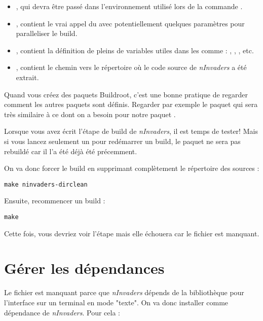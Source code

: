 \begin{itemize}

\item {}, qui devra être passé dans l'environnement utilisé
  lors de la commande .

\item {}, contient le vrai appel du  avec potentiellement
  quelques paramètres pour paralleliser le build.

\item {}, contient la définition de pleins de
  variables utiles dans les  comme : ,
  , , etc.

\item {}, contient le chemin vers le répertoire où le code source de
  {\em nInvaders} a été extrait.

\end{itemize}

Quand vous créez des paquets Buildroot, c'est une bonne pratique de regarder
comment les autres paquets sont définis. Regarder par exemple le paquet
 qui sera très similaire à ce dont on a besoin pour notre paquet
.

Lorsque vous avez écrit l'étape de build de {\em nInvaders}, il est temps
de tester! Mais si vous lancez seulement un  pour redémarrer
un build, le paquet  ne sera pas rebuildé car il l'a été
déjà été précemment.

On va donc forcer le build en supprimant complètement le répertoire des
sources :

\begin{verbatim}
make ninvaders-dirclean
\end{verbatim}

Ensuite, recommencer un build :

\begin{verbatim}
make
\end{verbatim}

Cette fois, vous devriez voir l'étape  mais
elle échouera car le fichier  est manquant.

\section{Gérer les dépendances}

Le fichier  est manquant parce que {\em nInvaders}
dépends de la bibliothèque  pour l'interface sur un terminal en
mode "texte". On va donc installer  comme dépendance de
{\em nInvaders}. Pour cela :

